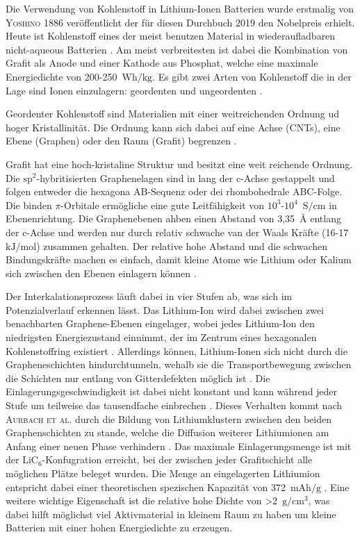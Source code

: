 Die Verwendung von Kohlenstoff in Lithium-Ionen Batterien wurde erstmalig von \textsc{Yoshino} \cite{Yoshino1986} 1886 veröffentlicht der für diesen Durchbuch 2019 den Nobelpreis erhielt.
Heute ist Kohlenstoff eines der meist benutzen Material in wiederaufladbaren nicht-aqueous Batterien \cite{Ahmad2021}. Am meist verbreitesten ist dabei die Kombination von Grafit als Anode und einer Kathode aus Phosphat, welche eine maximale Energiedichte von 200-250~$\si{\watt \hour \per \kg}$. 
Es gibt zwei Arten von Kohlenstoff die in der Lage sind Ionen einzulagern: geordenten und ungeordenten \cite{Ghosh2024}.

Geordenter Kohlenstoff sind Materialien mit einer weitreichenden Ordnung ud hoger Kristallinität. Die Ordnung kann sich dabei auf eine Achse (CNTs), eine Ebene (Graphen) oder den Raum (Grafit) begrenzen \cite{Wang2021}.

Grafit hat eine hoch-kristaline Struktur und besitzt eine weit reichende Ordnung. Die $\text{sp}^\text{2}$-hybritisierten Graphenelagen sind in lang der c-Achse gestappelt und folgen entweder die hexagona AB-Sequenz oder dei rhombohedrale ABC-Folge. Die binden $\pi$-Orbitale ermögliche eine gute Leitfähigkeit von $10^3$-$10^4$~$\si{\siemens \per \cm}$ in Ebenenrichtung. Die Graphenebenen ahben einen Abstand von 3,35~$\si{\angstrom}$ entlang der c-Achse und werden nur durch relativ schwache van der Waals Kräfte (16-17~$\si{\kJ \per \mol}$) zusammen gehalten. Der relative hohe Abstand und die schwachen Bindungskräfte machen es einfach, damit kleine Atome wie Lithium oder Kalium sich zwischen den Ebenen einlagern können \cite{Wang2021}.

Der Interkalationsprozess läuft dabei in vier Stufen ab, was sich im Potenzialverlauf erkennen lässt. Das Lithium-Ion wird dabei zwischen zwei benachbarten Graphene-Ebenen eingelager, wobei jedes Lithium-Ion den niedrigsten Energiezustand einnimmt, der im Zentrum eines hexagonalen Kohlenstoffring existiert \cite{Sole2014,Weng2023}. Allerdings können, Lithium-Ionen sich nicht durch die Grapheneschichten hindurchtunneln, wehalb sie die Transportbewegung zwischen die Schichten nur entlang von Gitterdefekten möglich ist \cite{Nishidate2005}. Die Einlagerungsgeschwindigkeit ist dabei nicht konstant und kann während jeder Stufe um teilweise das tausendfache einbrechen \cite{Levi1997}. Dieses Verhalten kommt nach \textsc{Aurbach et al.} durch die Bildung von Lithiumklustern zwischen den beiden Graphenschichten zu stande, welche die Diffusion weiterer Lithiumionen am Anfang einer neuen Phase verhindern \cite{Markevich2005}.  Das maximale Einlagerungsmenge ist mit der $\text{LiC}_\text{6}$-Konfugration erreicht, bei der zwischen jeder Grafitschicht alle möglichen Plätze beleget wurden. Die Menge an eingelagerten Lithiumion entspricht dabei  einer theoretischen spezischen Kapazität von 372~$\si{\mA \hour \per \g}$ \cite{Winter1998}. 
Eine weitere wichtige Eigenschaft ist die relative hohe Dichte von >2~$\si{\g \per \cm \cubed}$, was dabei hilft möglichst viel Aktivmaterial in kleinem Raum zu haben um kleine Batterien mit einer hohen Energiedichte zu erzeugen.

